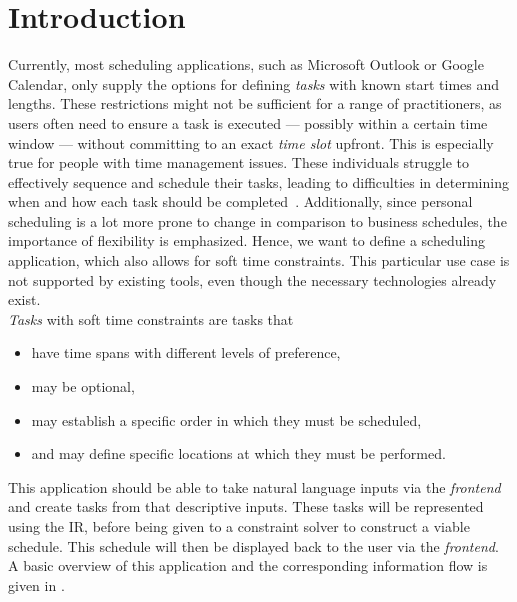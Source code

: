 \cleardoubleoddpage%
\chapter{Introduction}
\label{chapter:introduction}

Currently, most scheduling applications, such as Microsoft Outlook or Google Calendar, only supply the options for defining \emph{tasks} with known start times and lengths. These restrictions might not be sufficient for a range of practitioners, as users often need to ensure a task is executed --- possibly within a certain time window --- without committing to an exact \emph{time slot} upfront. This is especially true for people with time management issues. These individuals struggle to effectively sequence and schedule their tasks, leading to difficulties in determining when and how each task should be completed~\cite{bib:2015-rabinovici}. Additionally, since personal scheduling is a lot more prone to change in comparison to business schedules, the importance of flexibility is emphasized. Hence, we want to define a scheduling application, which also allows for soft time constraints. This particular use case is not supported by existing tools, even though the necessary technologies already exist. \\
\emph{Tasks} with soft time constraints are tasks that
\begin{itemize}
      \item have time spans with different levels of preference,
      \item may be optional,
      \item may establish a specific order in which they must be scheduled,
      \item and may define specific locations at which they must be performed.
\end{itemize}
This application should be able to take natural language inputs via the \emph{frontend} and create tasks from that descriptive inputs. These tasks will be represented using the \Ac{IR}, before being given to a constraint solver to construct a viable schedule. This schedule will then be displayed back to the user via the \emph{frontend}. A basic overview of this application and the corresponding information flow is given in .
